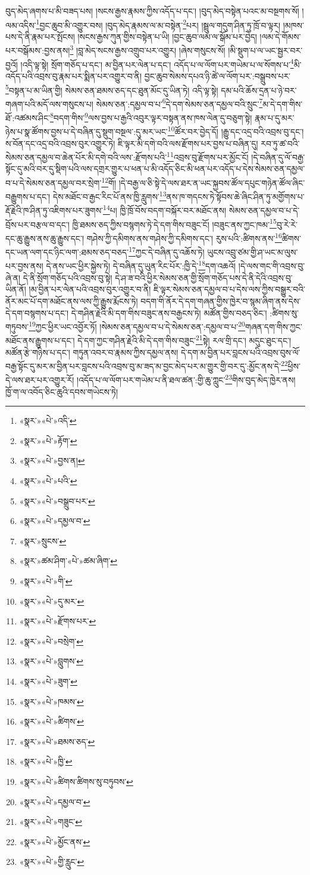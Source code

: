 བུད་མེད་ཞགས་པ་མི་བཟད་པས། །སངས་རྒྱས་རྣམས་ཀྱིས་འདོད་པ་དང་། །བུད་མེད་བསྟེན་པའང་མ་བསྔགས་སོ། །ལམ་འདིས་\footnote{«སྣར་»«པེ་»འདི་}བྱང་ཆུབ་མི་འགྱུར་བས། །བུད་མེད་རྣམས་ལ་མ་བསྟེན་\footnote{«སྣར་»«པེ་»རྟོག་}པར། །སྦྲུལ་གདུག་ཤིན་ཏུ་ཁྲོ་བ་ལྟར། །མཁས་པས་དེ་ནི་རྣམ་པར་སྤོངས། །སངས་རྒྱས་ཀུན་གྱིས་བསྟེན་པ་ཡི། །བྱང་ཆུབ་ལམ་ལ་སྒོམ་པར་བྱེད། །ལམ་དེ་གོམས་པར་བསྒོམས་:བྱས་ནས།\footnote{«སྣར་»«པེ་»བྱས་ན།} །བླ་མེད་སངས་རྒྱས་འགྲུབ་པར་འགྱུར། །ཞེས་གསུངས་སོ། །མི་སྡུག་པ་ལ་ཡང་སྦྱར་བར་བྱའོ། །འདི་ལྟ་སྟེ། སྲོག་གཅོད་པ་དང་། མ་བྱིན་པར་ལེན་པ་དང་། འདོད་པ་ལ་ལོག་པར་གཡེམ་པ་ལ་སོགས་པ་\footnote{«སྣར་»«པེ་»པའི་}མི་འདོད་པའི་འབྲས་བུ་རྣམ་པར་སྨིན་པར་འགྱུར་བ་ནི། བྱང་ཆུབ་སེམས་དཔའ་ཉི་ཚེ་ལ་ལོག་པར་:བསྒྲུབས་པར་\footnote{«སྣར་»«པེ་»བསྒྲུབ་པར་}བསྟན་པ་མ་ཡིན་གྱི། སེམས་ཅན་ཐམས་ཅད་དང་ཐུན་མོང་དུ་ཡིན་ཏེ། འདི་ལྟ་སྟེ། དམ་པའི་ཆོས་དྲན་པ་ཉེ་བར་གཞག་པའི་མདོ་ལས་གསུངས་པ། སེམས་ཅན་:དམྱལ་བ་པ་\footnote{«སྣར་»«པེ་»དམྱལ་བ་}དེ་དག་སེམས་ཅན་དམྱལ་བའི་སྲུང་\footnote{«སྣར་»སྲུངས་}མ་དེ་དག་གིས་ཐོ་:འཚམས་ཤིང་\footnote{«སྣར་»ཚམ་ཤིག་«པེ་»ཚམ་ཞིག་}བདག་གིས་\footnote{«སྣར་»«པེ་»གི་}ལས་བྱས་པ་རྒྱའི་འབུར་ལྟར་བསྟན་ནས་ཁས་ལེན་དུ་བཅུག་སྟེ། རྣམ་པ་དུ་མར་ཉེས་པ་སྣ་ཚོགས་བྱས་པ་དེ་བཞིན་དུ་སྡུག་བསྔལ་:དུ་མར་ཡང་\footnote{«སྣར་»«པེ་»དུ་མར་}ཚོར་བར་བྱེད་དོ། །རྒྱུ་དང་འདྲ་བའི་འབྲས་བུ་དང་། ས་བོན་དང་འདྲ་བའི་འབྲས་བུར་འགྱུར་ཏེ། ཇི་ལྟར་མི་དགེ་བའི་ལས་རྫོགས་པར་བྱས་པ་བཞིན་དུ། རབ་ཏུ་ཚ་བའི་སེམས་ཅན་དམྱལ་བ་ཆེན་པོར་མི་དགེ་བའི་ལས་:རྫོགས་པའི་\footnote{«སྣར་»«པེ་»རྫོགས་པར་}འབྲས་བུ་རྫོགས་པར་མྱོང་ངོ། །དེ་བཞིན་དུ་ལོ་བརྒྱ་སྟོང་དུ་མའི་བར་དུ་སྡིག་པའི་ལས་དགྲར་གྱུར་པ་ཕན་པ་མི་འདོད་ཅིང་མི་ཕན་པར་འདོད་པ་དེས་སེམས་ཅན་དམྱལ་བ་པ་དེ་སེམས་ཅན་དམྱལ་བར་སྲེག་\footnote{«སྣར་»«པེ་»བསྲེག་}གོ། །དེ་བརྒྱ་ལ་ཅི་སྟེ་དེ་ལས་ཐར་ན་ཡང་སྐྱབས་ཚོལ་དཔུང་གཉེན་ཚོལ་ཞིང་བརྒྱུགས་པ་དང་། དེས་མཐོང་བ་རྒྱང་རིང་པོ་ནས་ཁྱི་རླུགས་\footnote{«སྣར་»«པེ་»བླུགས་}ནས་ཁ་གདངས་ཏེ་སྟོབས་ཆེ་ཞིང་ཤིན་ཏུ་མགྱོགས་པ་རྡོ་རྗེའི་ཁ་ཤིན་ཏུ་འཇིགས་པར་ཟུགས་\footnote{«སྣར་»«པེ་»ཟུག་}པ། ཁྱི་ཁྲོ་བོས་བདག་བསྐོར་བར་མཐོང་ནས། སེམས་ཅན་དམྱལ་བ་པ་དེ་བྲོས་པར་བརྩལ་བ་དང་། ཁྱི་ཐམས་ཅད་ཀྱིས་བསྙགས་ཏེ་དེ་དག་གིས་བཟུང་ངོ། །བཟུང་ནས་ཀྱང་ཁམ་\footnote{«སྣར་»«པེ་»ཁམས་}བུ་རེ་རེ་དང་ཆུ་རྒྱུས་ནས་ཆུ་རྒྱུས་དང་། གཤེས་ཀྱི་དམིགས་ནས་གཤེས་ཀྱི་དམིགས་དང་། རུས་པའི་:ཚིགས་ནས་\footnote{«སྣར་»«པེ་»ཚིགས་}ཚིགས་དང་ཡན་ལག་དང་ཉིང་ལག་:ཐམས་ཅད་བཅད་\footnote{«སྣར་»«པེ་»ཐམས་ཅད་}ཀྱང་དེ་བཞིན་དུ་འཆོས་ཏེ། ཡུངས་འབྲུ་ཙམ་གྱི་ཤ་ཡང་མ་ལུས་པར་བྱས་ནས། དེ་ནས་ཡང་ཕྱིར་སྐྱེས་ཏེ། དེ་བཞིན་དུ་ཡུན་རིང་པོར་:ཁྱི་དེ་\footnote{«སྣར་»«པེ་»ཁྱི་}དག་འཆའོ། །དེ་ལས་གང་གི་འབྲས་བུ་ཞེ་ན། དེ་ནི་སྲོག་གཅོད་པའི་འབྲས་བུ་སྟེ། དེ་ཤ་ཟ་བའི་ཕྱིར་སེམས་ཅན་གྱི་སྲོག་གཅོད་པས་དེ་ནི་དེའི་འབྲས་བུ་ཡིན་ནོ། །མ་བྱིན་པར་ལེན་པའི་འབྲས་བུར་འགྱུར་བ་ནི། ཇི་ལྟར་སེམས་ཅན་དམྱལ་བ་པ་དེས་ལས་ཀྱིས་བསྒྱུར་བའི་ནོར་མང་པོ་དག་མཐོང་ནས་ལས་ཀྱི་རྒྱུས་རྨོངས་ཏེ། བདག་གི་ནོར་དེ་དག་གཞན་གྱིས་ཁྱེར་བ་སྙམ་ཞིག་ནས་དེས་དེ་དག་བསྙགས་པ་དང་། དེ་གཤིན་རྗེའི་མི་དག་གིས་བཟུང་ནས་བརྒྱངས་ཏེ། མཚོན་གྱིས་བཅད་ཅིང་། :ཚིགས་སུ་གཏུབས་\footnote{«སྣར་»«པེ་»ཚིགས་ཚིགས་སུ་བཏུབས་}ཀྱང་ཕྱིར་ཡང་འབྱོར་ཏོ། །སེམས་ཅན་དམྱལ་བ་པ་དེ་སེམས་ཅན་:དམྱལ་བ་པ་\footnote{«སྣར་»«པེ་»དམྱལ་བ་}གཞན་དག་གིས་ཀྱང་མཐོང་ནས་རྒྱུགས་པ་དང་། དེ་དག་ཀྱང་གཤིན་རྗེའི་མི་དེ་དག་གིས་བཟུང་\footnote{«སྣར་»«པེ་»གཟུང་}སྟེ། རལ་གྲི་དང་། མདུང་ཐུང་དང་། མཚོན་རྩེ་གཉིས་པ་དང་། གཏུན་འབར་བ་རྣམས་ཀྱིས་དམྱལ་ནས། དེ་དག་མ་བྱིན་པར་བླངས་པའི་འབྲས་བུས་ལོ་བརྒྱ་སྟོང་དུ་མར་མ་བྱིན་པར་བླངས་པའི་འབྲས་བུ་མ་ཟད་མ་བྱང་མེད་པར་མ་གྱུར་གྱི་བར་དུ་:མྱོང་ནས་དེ་\footnote{«སྣར་»«པེ་»མྱོང་ནས་}ཕྱིས་དེ་ལས་ཐར་པར་འགྱུར་རོ། །འདོད་པ་ལ་ལོག་པར་གཡེམ་པ་ནི་ཐལ་ཚན་:གྱི་ཆུ་ཀླུང་\footnote{«སྣར་»«པེ་»གྱི་རླུང་}གིས་བུད་མེད་ཁྱེར་ནས། ཁྱོ་ག་ལ་འབོད་ཅིང་ཆུའི་དབས་གཡེངས་ཏེ། 